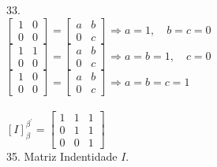 \documentclass[12pt]{article}
\begin{document}
33.\\
$\begin{bmatrix}1&0\\0&0\end{bmatrix}=\begin{bmatrix}a&b\\0&c\end{bmatrix}
\Longrightarrow a=1, \quad b=c=0$\\
$\begin{bmatrix}1&1\\0&0\end{bmatrix}=\begin{bmatrix}a&b\\0&c\end{bmatrix}
\Longrightarrow a=b=1, \quad c=0$\\
$\begin{bmatrix}1&0\\0&0\end{bmatrix}=\begin{bmatrix}a&b\\0&c\end{bmatrix}
\Longrightarrow a=b=c=1$\\\\
$[I]^{\beta^{'}}_{\beta} = \begin{bmatrix}1&1&1\\0&1&1\\0&0&1\end{bmatrix}$\\

35. Matriz Indentidade $I$.\\
\end{document}
